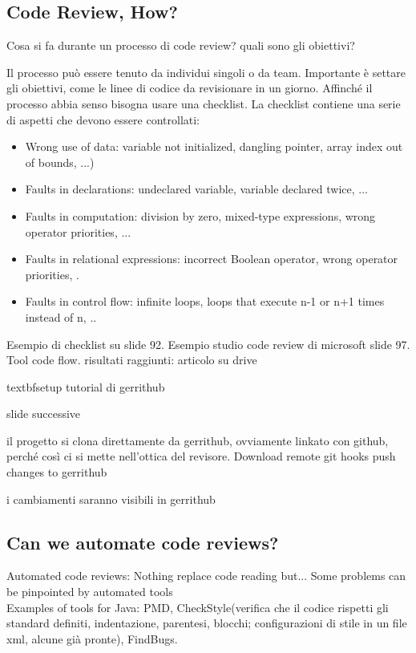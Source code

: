 \documentclass[10pt,a4paper]{book}
\begin{document}
\subsection{Code Review, How?}
Cosa si fa durante un processo di code review? quali sono gli obiettivi?

Il processo può essere tenuto da individui singoli o da team. Importante è settare gli obiettivi, come le linee di codice da revisionare in un giorno.
Affinché il processo abbia senso bisogna usare una checklist. La checklist contiene una serie di aspetti che devono essere controllati:
\begin{itemize}
\item Wrong use of data: variable not initialized, dangling pointer, array index out of bounds, ...)
\item Faults in declarations: undeclared variable, variable declared twice, ...
\item Faults in computation: division by zero, mixed-type expressions, wrong operator priorities, ...
\item Faults in relational expressions: incorrect Boolean operator, wrong operator priorities, .
\item Faults in control flow: infinite loops, loops that execute n-1 or n+1 times instead of n, ..
\end{itemize}

Esempio di checklist su slide 92. 
Esempio studio code review di microsoft slide 97. Tool code flow. risultati raggiunti: articolo su drive

\begin{Large}textbf{setup tutorial di gerrithub}\end{Large} slide successive

il progetto si clona direttamente da gerrithub, ovviamente linkato con github, perché così ci si mette nell'ottica del revisore.
Download remote git hooks
push changes to gerrithub

i cambiamenti saranno visibili in gerrithub

\subsection{Can we automate code reviews?}
Automated code reviews: Nothing replace code reading but... Some problems can be pinpointed by automated tools\\
Examples of tools for Java: PMD, CheckStyle(verifica che il codice rispetti gli standard definiti, indentazione, parentesi, blocchi; configurazioni di stile in un file xml, alcune già pronte), FindBugs.\bigskip 
\end{document}
